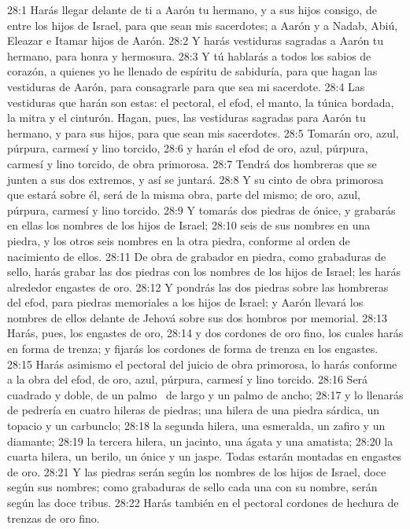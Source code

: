 28:1 Harás llegar delante de ti a Aarón tu hermano, y a sus hijos consigo, de entre los hijos de Israel, para que sean mis sacerdotes; a Aarón y a Nadab, Abiú, Eleazar e Itamar hijos de Aarón. 
28:2 Y harás vestiduras sagradas a Aarón tu hermano, para honra y hermosura. 
28:3 Y tú hablarás a todos los sabios de corazón, a quienes yo he llenado de espíritu de sabiduría, para que hagan las vestiduras de Aarón, para consagrarle para que sea mi sacerdote. 
28:4 Las vestiduras que harán son estas: el pectoral, el efod, el manto, la túnica bordada, la mitra y el cinturón. Hagan, pues, las vestiduras sagradas para Aarón tu hermano, y para sus hijos, para que sean mis sacerdotes. 
28:5 Tomarán oro, azul, púrpura, carmesí y lino torcido, 
28:6 y harán el efod de oro, azul, púrpura, carmesí y lino torcido, de obra primorosa. 
28:7 Tendrá dos hombreras que se junten a sus dos extremos, y así se juntará. 
28:8 Y su cinto de obra primorosa que estará sobre él, será de la misma obra, parte del mismo; de oro, azul, púrpura, carmesí y lino torcido. 
28:9 Y tomarás dos piedras de ónice, y grabarás en ellas los nombres de los hijos de Israel; 
28:10 seis de sus nombres en una piedra, y los otros seis nombres en la otra piedra, conforme al orden de nacimiento de ellos. 
28:11 De obra de grabador en piedra, como grabaduras de sello, harás grabar las dos piedras con los nombres de los hijos de Israel; les harás alrededor engastes de oro. 
28:12 Y pondrás las dos piedras sobre las hombreras del efod, para piedras memoriales a los hijos de Israel; y Aarón llevará los nombres de ellos delante de Jehová sobre sus dos hombros por memorial. 
28:13 Harás, pues, los engastes de oro, 
28:14 y dos cordones de oro fino, los cuales harás en forma de trenza; y fijarás los cordones de forma de trenza en los engastes. 
28:15 Harás asimismo el pectoral del juicio de obra primorosa, lo harás conforme a la obra del efod, de oro, azul, púrpura, carmesí y lino torcido. 
28:16 Será cuadrado y doble, de un palmo  de largo y un palmo de ancho; 
28:17 y lo llenarás de pedrería en cuatro hileras de piedras; una hilera de una piedra sárdica, un topacio y un carbunclo; 
28:18 la segunda hilera, una esmeralda, un zafiro y un diamante; 
28:19 la tercera hilera, un jacinto, una ágata y una amatista; 
28:20 la cuarta hilera, un berilo, un ónice y un jaspe. Todas estarán montadas en engastes de oro. 
28:21 Y las piedras serán según los nombres de los hijos de Israel, doce según sus nombres; como grabaduras de sello cada una con su nombre, serán según las doce tribus. 
28:22 Harás también en el pectoral cordones de hechura de trenzas de oro fino. 
